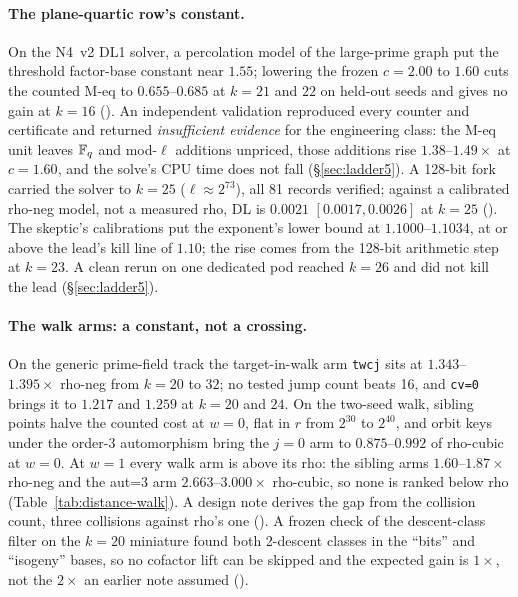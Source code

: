 \paragraph{The plane-quartic row's constant.} On the N4~v2 DL1 solver, a
percolation model of the large-prime graph put the threshold factor-base
constant near $1.55$; lowering the frozen $c=2.00$ to $1.60$ cuts the
counted M-eq to $0.655$--$0.685$ at $k=21$ and $22$ on held-out seeds and
gives no gain at $k=16$ ().
An independent validation reproduced every counter and certificate and
returned \emph{insufficient evidence} for the engineering class: the
M-eq unit leaves $\mathbb{F}_q$ and mod-$\ell$ additions unpriced, those
additions rise $1.38$--$1.49\times$ at $c=1.60$, and the solve's CPU time
does not fall (\S\ref{sec:ladder5}). A 128-bit fork carried the solver to
$k=25$ ($\ell\approx2^{73}$), all 81 records verified; against a calibrated
rho-neg model, not a measured rho, DL is $0.0021$ $[0.0017,0.0026]$ at
$k=25$ (). The
skeptic's calibrations put the exponent's lower bound at
$1.1000$--$1.1034$, at or above the lead's kill line of $1.10$; the rise
comes from the 128-bit arithmetic step at $k=23$. A clean rerun on one
dedicated pod reached $k=26$ and did not kill the lead
(\S\ref{sec:ladder5}).

\paragraph{The walk arms: a constant, not a crossing.} On the generic
prime-field track the target-in-walk arm \texttt{twcj} sits at
$1.343$--$1.395\times$ rho-neg from $k=20$ to $32$; no tested jump count
beats 16, and \texttt{cv=0} brings it to $1.217$ and $1.259$ at $k=20$ and
$24$. On the two-seed walk, sibling points halve the counted cost at
$w=0$, flat in $r$ from $2^{30}$ to $2^{40}$, and orbit keys under the
order-3 automorphism bring the $j=0$ arm to $0.875$--$0.992$ of rho-cubic
at $w=0$. At $w=1$ every walk arm is above its rho: the sibling arms
$1.60$--$1.87\times$ rho-neg and the aut=3 arm $2.663$--$3.000\times$
rho-cubic, so none is ranked below rho (Table~\ref{tab:distance-walk}). A design note derives the gap from the
collision count, three collisions against rho's one
().
A frozen check of the descent-class filter on the $k=20$ miniature found
both 2-descent classes in the ``bits'' and ``isogeny'' bases, so no
cofactor lift can be skipped and the expected gain is $1\times$, not the
$2\times$ an earlier note assumed
().

